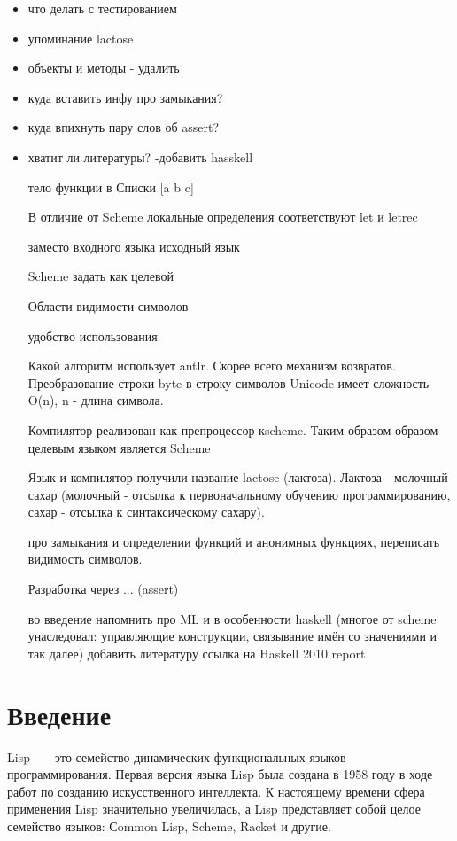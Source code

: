 \documentclass[12pt,a4paper,oneside]{extarticle}
\begin{document}
\begin{itemize}
    \item что делать с тестированием
    \item упоминание lactose
    \item объекты и методы - удалить
    \item куда вставить инфу про замыкания?
    \item куда впихнуть пару слов об assert?
    \item хватит ли литературы? -добавить hasskell


тело функции в {}
Списки [a b c]

В отличие от Scheme локальные определения соответствуют let и letrec

заместо входного языка исходный язык

Scheme задать как целевой

Области видимости символов

удобство использования

Какой алгоритм использует antlr.
Скорее всего механизм возвратов.
Преобразование строки byte в строку символов Unicode имеет сложность O(n), n - длина символа.

Компилятор реализован как препроцессор кscheme. Таким образом образом целевым языком является Scheme

Язык и компилятор получили название lactose (лактоза). Лактоза - молочный сахар (молочный - отсылка к первоначальному обучению программированию, сахар - отсылка к синтаксическому сахару).

про замыкания и определении функций и анонимных функциях, переписать видимость символов.

Разработка через ... (assert)

во введение напомнить про ML и в особенности haskell (многое от scheme унаследовал: управляющие конструкции, связывание имён со значениями и так далее)
добавить литературу ссылка на Haskell 2010 report
\end{itemize}

\clearpage

\section*{Введение}
    Lisp~---~это семейство динамических функциональных языков программирования.
    Первая версия языка Lisp была создана в 1958 году в ходе работ по созданию искусственного интеллекта.
    К настоящему времени сфера применения Lisp значительно увеличилась, а Lisp представляет собой целое семейство языков: Сommon Lisp, Scheme, Racket и другие. 
\end{document}

